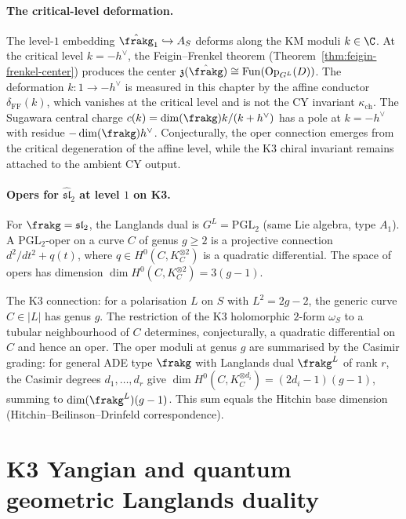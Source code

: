 \paragraph{The critical-level deformation.}
The level-$1$ embedding $\hat{\frakg}_1 \hookrightarrow A_S$ deforms along the KM moduli $k \in \C$. At the critical level $k = -h^\vee$, the Feigin--Frenkel theorem (Theorem~\ref{thm:feigin-frenkel-center}) produces the center $\mathfrak{z}(\hat{\frakg}) \cong \mathrm{Fun}(\mathrm{Op}_{G^L}(D))$. The deformation $k\colon 1 \to -h^\vee$ is measured in this chapter by the affine conductor $\delta_{\mathrm{FF}}(k)$, which vanishes at the critical level and is not the CY invariant $\kappa_{\mathrm{ch}}$. The Sugawara central charge $c(k) = \dim(\frakg) k / (k + h^\vee)$ has a pole at $k = -h^\vee$ with residue $-\dim(\frakg) h^\vee$. Conjecturally, the oper connection emerges from the critical degeneration of the affine level, while the K3 chiral invariant remains attached to the ambient CY output.

\paragraph{Opers for \texorpdfstring{$\hat{\mathfrak{sl}}_2$}{hatsl-2} at level \texorpdfstring{$1$}{1} on K3.}
For $\frakg = \mathfrak{sl}_2$, the Langlands dual is $G^L = \mathrm{PGL}_2$ (same Lie algebra, type $A_1$). A $\mathrm{PGL}_2$-oper on a curve $C$ of genus $g \geq 2$ is a projective connection $d^2/dt^2 + q(t)$, where $q \in H^0(C, K_C^{\otimes 2})$ is a quadratic differential. The space of opers has dimension $\dim H^0(C, K_C^{\otimes 2}) = 3(g - 1)$.

The K3 connection: for a polarisation $L$ on $S$ with $L^2 = 2g - 2$, the generic curve $C \in |L|$ has genus $g$. The restriction of the K3 holomorphic $2$-form $\omega_S$ to a tubular neighbourhood of $C$ determines, conjecturally, a quadratic differential on $C$ and hence an oper. The oper moduli at genus $g$ are summarised by the Casimir grading: for general ADE type $\frakg$ with Langlands dual $\frakg^L$ of rank $r$, the Casimir degrees $d_1, \ldots, d_r$ give $\dim H^0(C, K_C^{\otimes d_i}) = (2d_i - 1)(g - 1)$, summing to $\dim(\frakg^L)(g - 1)$. This sum equals the Hitchin base dimension (Hitchin--Beilinson--Drinfeld correspondence).


\section{K3 Yangian and quantum geometric Langlands duality}
\label{sec:k3-yangian-langlands}

